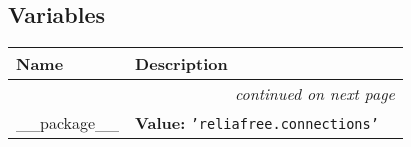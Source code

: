   \subsection{Variables}

    \vspace{-1cm}
\hspace{\varindent}\begin{longtable}{|p{\varnamewidth}|p{\vardescrwidth}|l}
\cline{1-2}
\cline{1-2} \centering \textbf{Name} & \centering \textbf{Description}& \\
\cline{1-2}
\endhead\cline{1-2}\multicolumn{3}{r}{\small\textit{continued on next page}}\\\endfoot\cline{1-2}
\endlastfoot\raggedright \_\-\_\-p\-a\-c\-k\-a\-g\-e\-\_\-\_\- & \raggedright \textbf{Value:} 
{\tt \texttt{'}\texttt{reliafree.connections}\texttt{'}}&\\
\cline{1-2}
\end{longtable}

